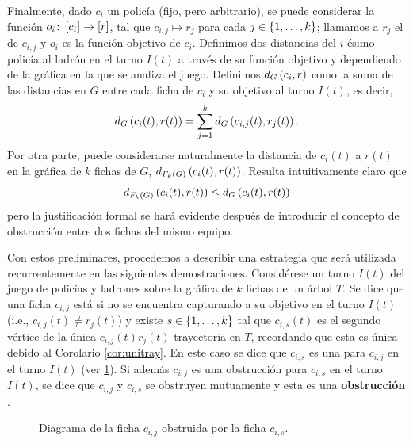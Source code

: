 Finalmente, dado $c_i$ un polic\'ia (fijo, pero arbitrario), se puede considerar
la funci\'on $o_i \colon \left[ c_i\right]\to \left[ r\right]$, tal que $c_{i,j}\mapsto r_j$ para
cada $j\in\{1,\dots, k\}$; llamamos a $r_j$ el  de $c_{i,j}$ y
$o_i$ es la funci\'on objetivo de $c_i$. Definimos dos distancias del
$i$-\'esimo polic\'ia al ladr\'on en el turno $I(t)$ a trav\'es de su funci\'on
objetivo y dependiendo de la gr\'afica en la que se analiza el juego. Definimos
$d_G \left( c_i,r\right)$ como la suma de las distancias en $G$ entre cada ficha de
$c_i$ y su objetivo al turno $I(t)$, es decir,
\[
    d_G \left( c_i(t),r(t)\right) = \sum_{j=1}^k d_G \left( c_{i,j}(t), r_j(t)\right).
\]
Por otra parte, puede considerarse naturalmente la distancia de $c_i(t)$ a
$r(t)$ en la gr\'afica de $k$ fichas de $G$, $d_{F_k(G)} \left( c_i(t),r(t)\right)$.
Resulta intuitivamente claro que
\begin{align}
\label{eq:suma}
    d_{F_k(G)} \left( c_i(t),r(t)\right) \leq d_G \left( c_i(t),r(t)\right)
\end{align}
pero la justificaci\'on formal se har\'a evidente despu\'es de introducir el
concepto de obstrucci\'on entre dos fichas del mismo equipo.

Con estos preliminares, procedemos a describir una estrategia que ser\'a
utilizada recurrentemente en las siguientes demostraciones. Consid\'erese un
turno $I(t)$ del juego de polic\'ias y ladrones sobre la gr\'afica de $k$ fichas
de un \'arbol $T$. Se dice que una ficha $c_{i,j}$ est\'a  si
no se encuentra capturando a su objetivo en el turno $I(t)$ (i.e., $c_{i,j}(t)\neq
r_j(t)$) y existe $s \in \{1,\dots, k\}$ tal que $c_{i,s}(t)$ es el segundo
v\'ertice de la \'unica $c_{i,j}(t)r_j(t)$-trayectoria en $T$, recordando que
esta es \'unica debido al Corolario \ref{cor:unitray}. En este caso se dice que
$c_{i,s}$ es una  para $c_{i,j}$ en el turno $I(t)$ (ver
\cref{fig:obstruccion}). Si adem\'as $c_{i,j}$ es una obstrucci\'on para
$c_{i,s}$ en el turno $I(t)$, se dice que $c_{i,j}$ y $c_{i,s}$ se obstruyen
mutuamente y esta es una \textbf{obstrucci\'on}
.

\begin{figure}[H]
    \centering
    \captionsetup{font=footnotesize}
    \caption{Diagrama de la ficha $c_{i,j}$ obstruida por la ficha $c_{i,s}$.}
    \label{fig:obstruccion}
\end{figure}

